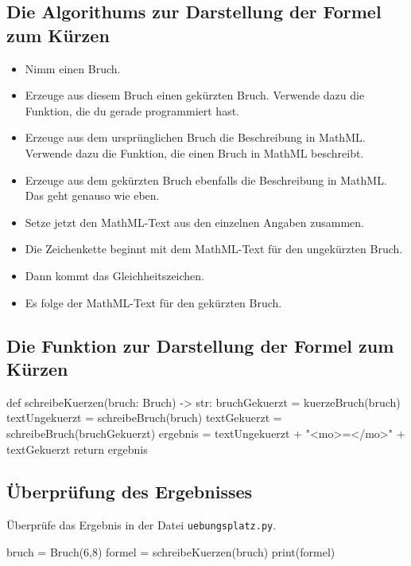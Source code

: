 \subsection*{Die Algorithums zur Darstellung der Formel zum Kürzen}

\begin{itemize}
	\item Nimm einen Bruch.
	\item Erzeuge aus diesem Bruch einen gekürzten Bruch. Verwende dazu die Funktion, die du gerade programmiert hast.
	\item Erzeuge aus dem ursprünglichen Bruch die Beschreibung in MathML. Verwende dazu die Funktion, die einen Bruch in MathML beschreibt.
	\item Erzeuge aus dem gekürzten Bruch ebenfalls die Beschreibung in MathML. Das geht genauso wie eben.
	\item Setze jetzt den MathML-Text aus den einzelnen Angaben zusammen.
	\item Die Zeichenkette beginnt mit dem MathML-Text für den ungekürzten Bruch.
	\item Dann kommt das Gleichheitszeichen.
	\item Es folge der MathML-Text für den gekürzten Bruch.
\end{itemize}

\subsection*{Die Funktion zur Darstellung der Formel zum Kürzen}

\begin{codePython}
def schreibeKuerzen(bruch: Bruch) -> str:
	bruchGekuerzt = kuerzeBruch(bruch)
	textUngekuerzt = schreibeBruch(bruch)
	textGekuerzt = schreibeBruch(bruchGekuerzt)
	ergebnis = textUngekuerzt + "<mo>=</mo>" + textGekuerzt
	return ergebnis
\end{codePython}

\subsection*{Überprüfung des Ergebnisses}

Überprüfe das Ergebnis in der Datei \texttt{uebungsplatz.py}. 

\begin{codePython}
bruch = Bruch(6,8)
formel = schreibeKuerzen(bruch)
print(formel)
\end{codePython}

